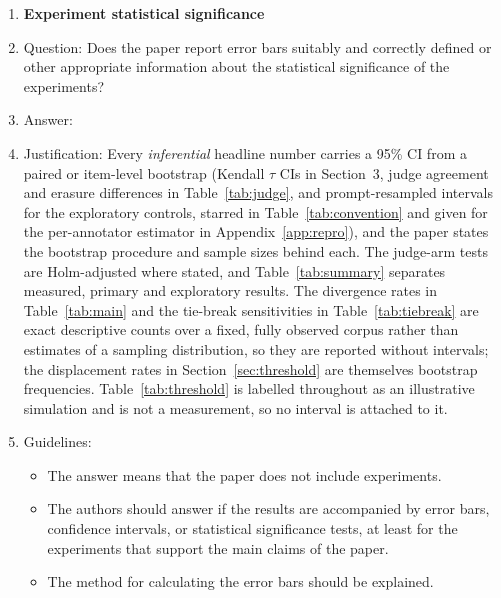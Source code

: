 \documentclass{article}
\begin{document}
\begin{enumerate}
\item {\bf Experiment statistical significance}
    \item[] Question: Does the paper report error bars suitably and correctly defined or other appropriate information about the statistical significance of the experiments?
    \item[] Answer: \answerYes{}
    \item[] Justification: Every \emph{inferential} headline number carries a 95\% CI from a paired or item-level bootstrap (Kendall $\tau$ CIs in Section~3, judge agreement and erasure differences in Table~\ref{tab:judge}, and prompt-resampled intervals for the exploratory controls, starred in Table~\ref{tab:convention} and given for the per-annotator estimator in Appendix~\ref{app:repro}), and the paper states the bootstrap procedure and sample sizes behind each. The judge-arm tests are Holm-adjusted where stated, and Table~\ref{tab:summary} separates measured, primary and exploratory results. The divergence rates in Table~\ref{tab:main} and the tie-break sensitivities in Table~\ref{tab:tiebreak} are exact descriptive counts over a fixed, fully observed corpus rather than estimates of a sampling distribution, so they are reported without intervals; the displacement rates in Section~\ref{sec:threshold} are themselves bootstrap frequencies. Table~\ref{tab:threshold} is labelled throughout as an illustrative simulation and is not a measurement, so no interval is attached to it.
    \item[] Guidelines:
    \begin{itemize}
        \item The answer \answerNA{} means that the paper does not include experiments.
        \item The authors should answer \answerYes{} if the results are accompanied by error bars, confidence intervals, or statistical significance tests, at least for the experiments that support the main claims of the paper.
        \item The method for calculating the error bars should be explained.
    \end{itemize}


\end{enumerate}
\end{document}
